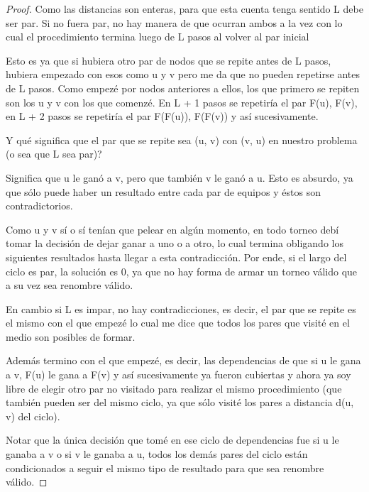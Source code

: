 \begin{proof}
	Como las distancias son enteras, para que esta cuenta tenga sentido L debe ser par. Si no fuera par, no hay manera de que ocurran ambos a la vez con lo cual el procedimiento termina luego de L pasos al volver al par inicial \newline

	Esto es ya que si hubiera otro par de nodos que se repite antes de L pasos, hubiera empezado con esos como u y v pero me da que no pueden repetirse antes de L pasos. Como empezé por nodos anteriores a ellos, los que primero se repiten son los u y v con los que comenzé. En L + 1 pasos se repetiría el par F(u), F(v), en L + 2 pasos se repetiría el par F(F(u)), F(F(v)) y así sucesivamente. \newline
	
	Y qué significa que el par que se repite sea (u, v) con (v, u) en nuestro problema (o sea que L sea par)? \newline

	Significa que u le ganó a v, pero que también v le ganó a u. Esto es absurdo, ya que sólo puede haber un resultado entre cada par de equipos y éstos son contradictorios. \newline

	Como u y v sí o sí tenían que pelear en algún momento, en todo torneo debí tomar la decisión de dejar ganar a uno o a otro, lo cual termina obligando los siguientes resultados hasta llegar a esta contradicción. Por ende, si el largo del ciclo es par, la solución es 0, ya que no hay forma de armar un torneo válido que a su vez sea renombre válido. \newline

	En cambio si L es impar, no hay contradicciones, es decir, el par que se repite es el mismo con el que empezé lo cual me dice que todos los pares que visité en el medio son posibles de formar. \newline

	Además termino con el que empezé, es decir, las dependencias de que si u le gana a v, F(u) le gana a F(v) y así sucesivamente ya fueron cubiertas y ahora ya soy libre de elegir otro par no visitado para realizar el mismo procedimiento (que también pueden ser del mismo ciclo, ya que sólo visité los pares a distancia d(u, v) del ciclo). \newline

	Notar que la única decisión que tomé en ese ciclo de dependencias fue si u le ganaba a v o si v le ganaba a u, todos los demás pares del ciclo están condicionados a seguir el mismo tipo de resultado para que sea renombre válido. \newline


\end{proof}
